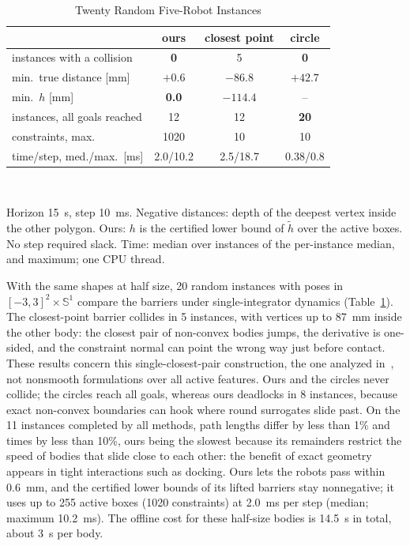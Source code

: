 \documentclass[journal]{IEEEtran}
\theoremstyle{definition}
\newcommand{\Sone}{\mathbb{S}^1}
\begin{document}
\begin{table}[t]
\caption{Twenty Random Five-Robot Instances}
\label{tab:stats}
\centering
\footnotesize
\setlength{\tabcolsep}{4pt}
\renewcommand{\arraystretch}{1.05}
\begin{tabular}{lccc}
\toprule
& ours & closest point & circle\\
\midrule
instances with a collision & \textbf{0} & 5 & \textbf{0}\\
min.\ true distance [mm] & $+0.6$ & $-86.8$ & $+42.7$\\
min.\ $h$ [mm] & \textbf{0.0} & $-114.4$ & --\\
instances, all goals reached & 12 & 12 & \textbf{20}\\
constraints, max. & 1020 & 10 & 10\\
time/step, med./max.\ [ms] & 2.0/10.2 & 2.5/18.7 & 0.38/0.8\\
\bottomrule
\end{tabular}
\\[3pt]
\parbox{\columnwidth}{\footnotesize Horizon 15~s, step 10~ms. Negative distances: depth of the
deepest vertex inside the other polygon. Ours: $h$ is the certified lower bound of $\tilde h$ over the
active boxes. No step required slack. Time: median over instances of the per-instance median, and
maximum; one CPU thread.}
\end{table}

With the same shapes at half size, 20 random instances with poses in $[-3,3]^2\times\Sone$ compare
the barriers under single-integrator dynamics (Table~\ref{tab:stats}). The closest-point barrier
collides in 5 instances, with vertices up to 87~mm inside the other body: the closest pair of
non-convex bodies jumps, the derivative is one-sided, and the constraint normal can point the wrong
way just before contact. These results concern this single-closest-pair construction, the one
analyzed in~\cite{jo2026geometry}, not nonsmooth formulations over all active features. Ours and the
circles never collide; the circles reach all goals, whereas ours deadlocks in 8 instances, because
exact non-convex boundaries can hook where round surrogates slide past. On the 11 instances completed
by all methods, path lengths differ by less than 1\% and times by less than 10\%, ours being the
slowest because its remainders restrict the speed of bodies that slide close to each other: the
benefit of exact geometry appears in tight interactions such as docking. Ours lets the robots pass
within 0.6~mm, and the certified lower bounds of its lifted barriers stay nonnegative; it uses up to
255 active boxes (1020 constraints) at 2.0~ms per step (median; maximum 10.2~ms). The offline cost
for these half-size bodies is 14.5~s in total, about 3~s per body.
\end{document}
